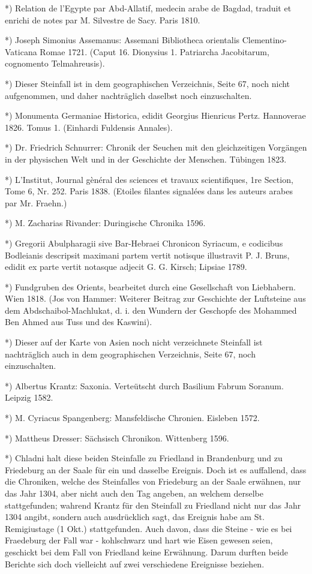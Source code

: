 \documentclass[a4paper, 8pt, oneside, polutonikogreek, german]{article}
\begin{document}
*) Relation de l'Egypte par Abd-Allatif, medecin arabe de Bagdad, traduit et enrichi de notes par M. Silvestre de Sacy. Paris 1810.

*) Joseph Simonius Assemanus: Assemani Bibliotheca orientalis Clementino-Vaticana Romae 1721. (Caput 16. Dionysius 1. Patriarcha Jacobitarum, cognomento Telmahreusis).

*) Dieser Steinfall ist in dem geographischen Verzeichnis, Seite 67, noch nicht aufgenommen, und daher nachträglich daselbst noch einzuschalten.

*) Monumenta Germaniae Historica, edidit Georgius Hienricus Pertz. Hannoverae 1826. Tomus 1. (Einhardi Fuldensis Annales).

*) Dr. Friedrich Schnurrer: Chronik der Seuchen mit den gleichzeitigen Vorgängen in der physischen Welt und in der Geschichte der Menschen. Tübingen 1823.

*) L'Institut, Journal gènéral des sciences et travaux scientifiques, 1re Section, Tome 6, Nr. 252. Paris 1838. (Etoiles filantes signalées dans les auteurs arabes par Mr. Fraehn.)

*) M. Zacharias Rivander: Duringische Chronika 1596.

*) Gregorii Abulpharagii sive Bar-Hebraei Chronicon Syriacum, e codicibus Bodleianis descripsit maximani partem vertit notisque illustravit P. J. Bruns, edidit ex parte vertit notasque adjecit G. G. Kirsch; Lipsiae 1789.

*) Fundgruben des Orients, bearbeitet durch eine Gesellschaft von Liebhabern. Wien 1818. (Jos von Hammer: Weiterer Beitrag zur Geschichte der Luftsteine aus dem Abdschaibol-Machlukat, d. i. den Wundern der Geschopfe des Mohammed Ben Ahmed aus Tuss und des Kaswini).

*) Dieser auf der Karte von Asien noch nicht verzeichnete Steinfall ist nachträglich auch in dem geographischen Verzeichnis, Seite 67, noch einzuschalten.

*) Albertus Krantz: Saxonia. Verteütscht durch Basilium Fabrum Soranum. Leipzig 1582.

*) M. Cyriacus Spangenberg: Mansfeldische Chronien. Eisleben 1572.

*) Mattheus Dresser: Sächsisch Chronikon. Wittenberg 1596.

*) Chladni halt diese beiden Steinfalle zu Friedland in Brandenburg und zu Friedeburg an der Saale für ein und dasselbe Ereignis. Doch ist es auffallend, dass die Chroniken, welche des Steinfalles von Friedeburg an der Saale erwähnen, nur das Jahr 1304, aber nicht auch den Tag angeben, an welchem derselbe stattgefunden; wahrend Krantz für den Steinfall zu Friedland nicht nur das Jahr 1304 angibt, sondern auch ausdrücklich sagt, das Ereignis habe am St. Remigiustage (1 Okt.) stattgefunden. Auch davon, dass die Steine - wie es bei Fraedeburg der Fall war - kohlschwarz und hart wie Eisen gewesen seien, geschickt bei dem Fall von Friedland keine Erwähnung. Darum durften beide Berichte sich doch vielleicht auf zwei verschiedene Ereignisse beziehen.
\end{document}
